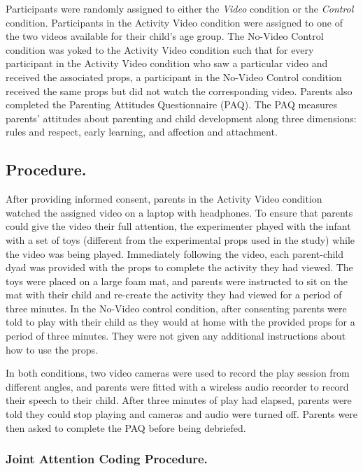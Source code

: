 \documentclass[10pt, letterpaper]{article}
\begin{document}
Participants were randomly assigned to either the \emph{Video} condition
or the \emph{Control} condition. Participants in the Activity Video
condition were assigned to one of the two videos available for their
child's age group. The No-Video Control condition was yoked to the
Activity Video condition such that for every participant in the Activity
Video condition who saw a particular video and received the associated
props, a participant in the No-Video Control condition received the same
props but did not watch the corresponding video. Parents also completed
the Parenting Attitudes Questionnaire (PAQ). The PAQ measures parents'
attitudes about parenting and child development along three dimensions:
rules and respect, early learning, and affection and attachment.

\subsection{Procedure.}\label{procedure.}

After providing informed consent, parents in the Activity Video
condition watched the assigned video on a laptop with headphones. To
ensure that parents could give the video their full attention, the
experimenter played with the infant with a set of toys (different from
the experimental props used in the study) while the video was being
played. Immediately following the video, each parent-child dyad was
provided with the props to complete the activity they had viewed. The
toys were placed on a large foam mat, and parents were instructed to sit
on the mat with their child and re-create the activity they had viewed
for a period of three minutes. In the No-Video control condition, after
consenting parents were told to play with their child as they would at
home with the provided props for a period of three minutes. They were
not given any additional instructions about how to use the props.

In both conditions, two video cameras were used to record the play
session from different angles, and parents were fitted with a wireless
audio recorder to record their speech to their child. After three
minutes of play had elapsed, parents were told they could stop playing
and cameras and audio were turned off. Parents were then asked to
complete the PAQ before being debriefed.

\subsubsection{Joint Attention Coding
Procedure.}\label{joint-attention-coding-procedure.}
\end{document}
